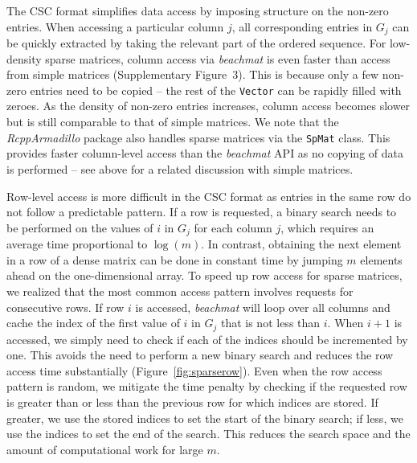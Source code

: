 \documentclass[10pt,letterpaper]{article}
\newcommand{\beachmat}{\textit{beachmat}}
\newcommand{\code}[1]{\texttt{#1}}
\newcommand{\suppfigsparsecol}{3}
\begin{document}

The CSC format simplifies data access by imposing structure on the non-zero entries.
When accessing a particular column $j$, all corresponding entries in $G_j$ can be quickly extracted by taking the relevant part of the ordered sequence.
For low-density sparse matrices, column access via \beachmat{} is even faster than access from simple matrices (Supplementary Figure~\suppfigsparsecol{}).
This is because only a few non-zero entries need to be copied -- the rest of the \code{Vector} can be rapidly filled with zeroes.
As the density of non-zero entries increases, column access becomes slower but is still comparable to that of simple matrices.
We note that the \textit{RcppArmadillo} package \cite{eddelbuettel2014arma} also handles sparse matrices via the \code{SpMat} class.
This provides faster column-level access than the \beachmat{} API as no copying of data is performed -- see above for a related discussion with simple matrices.

Row-level access is more difficult in the CSC format as entries in the same row do not follow a predictable pattern.
If a row is requested, a binary search needs to be performed on the values of $i$ in $G_j$ for each column $j$, which requires an average time proportional to $\log(m)$.
In contrast, obtaining the next element in a row of a dense matrix can be done in constant time by jumping $m$ elements ahead on the one-dimensional array.
To speed up row access for sparse matrices, we realized that the most common access pattern involves requests for consecutive rows.
If row $i$ is accessed, \beachmat{} will loop over all columns and cache the index of the first value of $i$ in $G_j$ that is not less than $i$.
When $i+1$ is accessed, we simply need to check if each of the indices should be incremented by one.
This avoids the need to perform a new binary search and reduces the row access time substantially (Figure~\ref{fig:sparserow}).
Even when the row access pattern is random, we mitigate the time penalty by checking if the requested row is greater than or less than the previous row for which indices are stored.
If greater, we use the stored indices to set the start of the binary search; if less, we use the indices to set the end of the search. 
This reduces the search space and the amount of computational work for large $m$.

\end{document}
